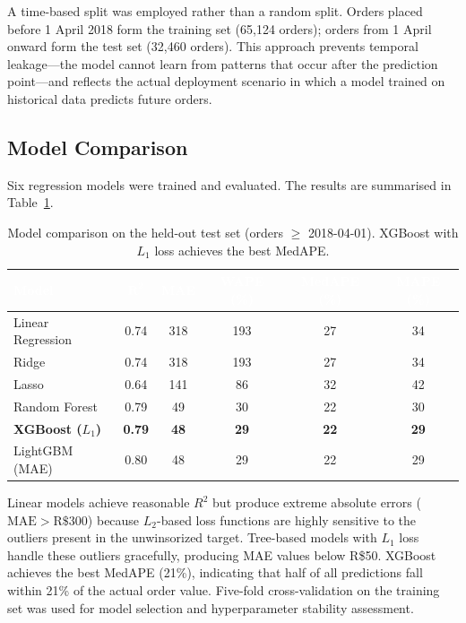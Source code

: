 \documentclass[11pt,a4paper]{article}
\begin{document}
A time-based split was employed rather than a random split.  Orders placed
before 1 April 2018 form the training set (65{,}124 orders); orders from
1 April onward form the test set (32{,}460 orders).  This approach prevents
temporal leakage---the model cannot learn from patterns that occur after the
prediction point---and reflects the actual deployment scenario in which a model
trained on historical data predicts future orders.

\subsection{Model Comparison}

Six regression models were trained and evaluated.  The results are summarised
in Table~\ref{tab:models}.

\begin{table}[H]
\centering
\small
{}
\begin{tabular}{l ccccc}
\toprule
\rowcolor{tablehead}
\textcolor{white}{\textbf{Model}} & \textcolor{white}{$\boldsymbol{R^{2}}$} & \textcolor{white}{\textbf{MAE}} & \textcolor{white}{\textbf{WAPE (\%)}} & \textcolor{white}{\textbf{MedAPE (\%)}} & \textcolor{white}{\textbf{MAPE (\%)}} \\
\midrule
Linear Regression & 0.74 & 318 & 193 & 27 & 34 \\
Ridge             & 0.74 & 318 & 193 & 27 & 34 \\
Lasso             & 0.64 & 141 &  86 & 32 & 42 \\
Random Forest     & 0.79 &  49 &  30 & 22 & 30 \\
\rowcolor{accentcolor!15}
\textbf{XGBoost ($L_1$)} & \textbf{0.79} & \textbf{48} & \textbf{29} & \textbf{22} & \textbf{29} \\
LightGBM (MAE)    & 0.80 &  48 &  29 & 22 & 29 \\
\bottomrule
\end{tabular}
\caption{Model comparison on the held-out test set (orders $\geq$ 2018-04-01).
         XGBoost with $L_{1}$ loss achieves the best MedAPE.}
\label{tab:models}
\end{table}

Linear models achieve reasonable $R^{2}$ but produce extreme absolute errors
($\text{MAE} > \text{R\$}300$) because $L_{2}$-based loss functions are highly
sensitive to the outliers present in the unwinsorized target.  Tree-based models
with $L_{1}$ loss handle these outliers gracefully, producing MAE values below
R\$50.  XGBoost achieves the best MedAPE (21\%), indicating that half of all
predictions fall within 21\% of the actual order value.  Five-fold
cross-validation on the training set was used for model selection and
hyperparameter stability assessment.
\end{document}
